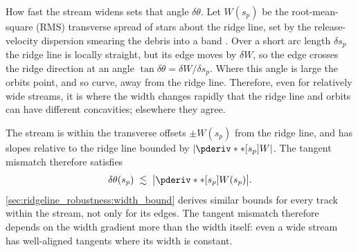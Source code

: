 \documentclass[linenumbers,twocolumn]{aastex701}
\newcommand{\sarc}{s}  %
\newcommand{\proj}[1]{{#1}_{p}}  %
\newcommand{\ssky}{\proj{\sarc}} %
\begin{document}
        How fast the stream widens sets that angle $\delta\theta$. %
        Let $W(\ssky)$ be the root-mean-square (RMS) transverse spread of stars about the ridge line, set by the release-velocity dispersion smearing the debris into a band \citep{Kupper+:2010:TidalTailsStar,Kupper+:2012:MoreStructureTidal,Bovy:2014:DynamicalModelingTidal}. %
        Over a short arc length $\delta\ssky$ the ridge line is locally straight, but its edge moves by $\delta W$, so the edge crosses the ridge direction at an angle $\tan\delta\theta = \delta W/\delta\ssky$. %
        Where this angle is large the orbits point, and so curve, away from the ridge line. %
        Therefore, even for relatively wide streams, it is where the width changes rapidly that the ridge line and orbits can have different concavities; elsewhere they agree. %

        The stream is within the transverse offsets $\pm W(\ssky)$ from the ridge line, and has slopes relative to the ridge line bounded by $|\pderiv**[\ssky]{W}|$. %
        The tangent mismatch therefore satisfies %
        \begin{equation}\label{eq:streams:width_bound}
            \delta\theta(\ssky)
            \;\lesssim\;
            \bigl|\pderiv**[\ssky]{W(\ssky)}\bigr| . %
        \end{equation}
        \autoref{sec:ridgeline_robustness:width_bound} derives similar bounds for every track within the stream, not only for its edges. %
        The tangent mismatch therefore depends on the width gradient more than the width itself: even a wide stream has well-aligned tangents where its width is constant. %
\end{document}
